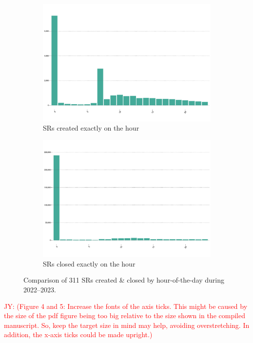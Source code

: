 \documentclass[linenumber]{jdsart}
\newcommand{\jy}[1]{\textcolor{red}{JY: (#1)}}
\begin{document}
\begin{figure}[tbp]
    \centering
    \begin{subfigure}[t]{0.495\textwidth} %
        \centering
        \includegraphics[width=\textwidth]{2-year-trend_SRs_created_on_the_hour.pdf}
        \caption{SRs created exactly on the hour}
        \label{fig:busiestcreated}
    \end{subfigure}
    \hfill %
    \begin{subfigure}[t]{0.495\textwidth} %
        \centering
        \includegraphics[width=\textwidth]{2-year-trend_SRs_closed_on_the_hour.pdf}
        \caption{SRs closed exactly on the hour}
        \label{fig:busiestclosed}
    \end{subfigure}
    \caption{Comparison of 311 SRs created \& closed by hour-of-the-day during 2022--2023.}
    \label{fig:exacthours}
\end{figure}
\jy{Figure 4 and 5: Increase the fonts of the axis ticks. This might
  be caused by the size of the pdf figure being too big relative to
  the size shown in the compiled manuscript. So, keep the target size
  in mind may help, avoiding overstretching. In addition, the x-axis
  ticks could be made upright.}
\end{document}
